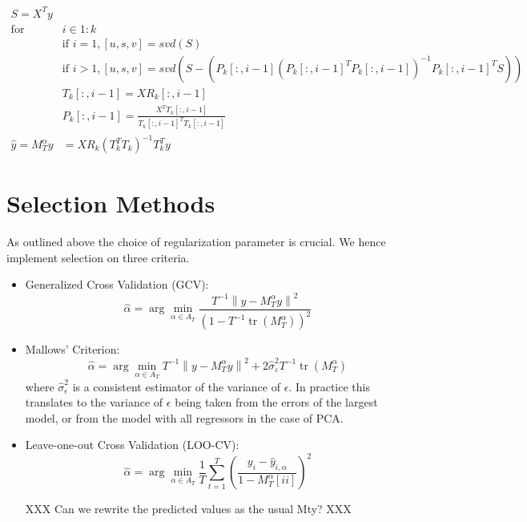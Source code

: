\begin{align}
\nonumber S = X^{T} y & \\
\nonumber \text{for } & i \in 1:k \\
\nonumber &\text{if } i = 1, [u, s, v] = svd(S) \\
\nonumber &\text{if } i > 1, [u, s, v] = svd(S - (P_{k}[:, i-1](P_{k}[:, i-1]^{T} P_{k}[:, i-1])^{-1} P_{k}[:, i-1]^{T} S)) \\
\nonumber &T_{k}[:, i - 1] = X R_{k}[:, i - 1] \\
\nonumber &P_{k}[:, i - 1] = \frac{X^{T} T_{k}[:, i - 1]}{T_{k}[:, i - 1]^{T}T_{k}[:, i - 1]} \\
\nonumber \widehat{y} = M^{\alpha}_{T} y &= X R_{k} (T^{T}_{k} T_{k})^{-1} T^{T}_{k} y
\end{align}

\section{Selection Methods} \label{sec::cv}

As outlined above the choice of regularization parameter is crucial. We hence implement selection on three criteria.

\begin{itemize}
	\item Generalized Cross Validation (GCV): \\
\[\hat{\alpha}=\arg \min _{\alpha \in A_{T}} \frac{T^{-1}\left\|y-M_{T}^{\alpha} y\right\|^{2}}{\left(1-T^{-1} \operatorname{tr}\left(M_{T}^{\alpha}\right)\right)^{2}}\]

	\item Mallows' Criterion: \\
\[\hat{\alpha}=\arg \min _{\alpha \in A_{T}} T^{-1}\left\|y-M_{T}^{\alpha} y\right\|^{2}+2 \widehat{\sigma}_{\varepsilon}^{2} T^{-1} \operatorname{tr}\left(M_{T}^{\alpha}\right)\]
where $\widehat{\sigma}_{\epsilon}^{2}$ is a consistent estimator of the variance of $\epsilon$. In practice this translates to the variance of $\epsilon$ being taken from the errors of the largest model, or from the model with all regressors in the case of PCA.

	\item Leave-one-out Cross Validation (LOO-CV): \\
\[\hat{\alpha}=\arg \min _{\alpha \in A_{T}} \frac{1}{T} \sum_{t=1}^{T}\left(\frac{y_{i}-\hat{y}_{i, \alpha}}{1-M_{T}^{\alpha}[ii]}\right)^{2}\]

XXX Can we rewrite the predicted values as the usual Mty? XXX
\end{itemize}

